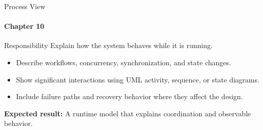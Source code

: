 \begin{frame}{Process View}
\framesubtitle{Chapter 10}
\begin{block}{Responsibility}
Explain how the system behaves while it is running.
\end{block}
\begin{itemize}
  \item Describe workflows, concurrency, synchronization, and state changes.
  \item Show significant interactions using UML activity, sequence, or state diagrams.
  \item Include failure paths and recovery behavior where they affect the design.
\end{itemize}
\vspace{0.15cm}
\textbf{Expected result:} A runtime model that explains coordination and observable behavior.
\end{frame}
